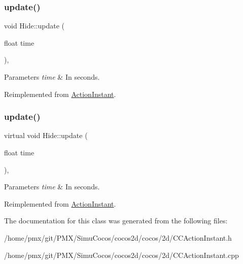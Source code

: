 \mbox{\label{classHide_a108b8127537cc5da94f63444e3fb23f3}} 
\subsubsection{\texorpdfstring{update()}{update()}\hspace{0.1cm}{\footnotesize\ttfamily [1/2]}}
{\footnotesize\ttfamily void Hide\+::update (\begin{DoxyParamCaption}\item[{float}]{time }\end{DoxyParamCaption})\hspace{0.3cm}{\ttfamily [override]}, {\ttfamily [virtual]}}


\begin{DoxyParams}{Parameters}
{\em time} & In seconds. \\
\hline
\end{DoxyParams}


Reimplemented from \hyperlink{classActionInstant_a59875bf08cd1f58c0c8c6693ac540ade}{Action\+Instant}.

\mbox{\label{classHide_ab63f0961b2bac19ff3fa4581e7342d9d}} 
\subsubsection{\texorpdfstring{update()}{update()}\hspace{0.1cm}{\footnotesize\ttfamily [2/2]}}
{\footnotesize\ttfamily virtual void Hide\+::update (\begin{DoxyParamCaption}\item[{float}]{time }\end{DoxyParamCaption})\hspace{0.3cm}{\ttfamily [override]}, {\ttfamily [virtual]}}


\begin{DoxyParams}{Parameters}
{\em time} & In seconds. \\
\hline
\end{DoxyParams}


Reimplemented from \hyperlink{classActionInstant_a59875bf08cd1f58c0c8c6693ac540ade}{Action\+Instant}.



The documentation for this class was generated from the following files\+:\begin{DoxyCompactItemize}
\item 
/home/pmx/git/\+P\+M\+X/\+Simu\+Cocos/cocos2d/cocos/2d/C\+C\+Action\+Instant.\+h\item 
/home/pmx/git/\+P\+M\+X/\+Simu\+Cocos/cocos2d/cocos/2d/C\+C\+Action\+Instant.\+cpp\end{DoxyCompactItemize}
